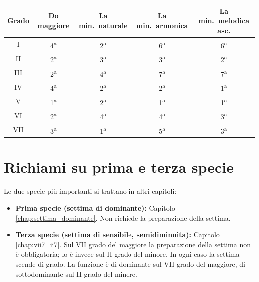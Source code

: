 \begin{center}
\begin{tabular}{ccccc}
\toprule
\textbf{Grado} & \textbf{Do maggiore} & \textbf{La min.\ naturale} & \textbf{La min.\ armonica} & \textbf{La min.\ melodica asc.} \\
\midrule
I & 4\textsuperscript{a} & 2\textsuperscript{a} & 6\textsuperscript{a} & 6\textsuperscript{a} \\
II & 2\textsuperscript{a} & 3\textsuperscript{a} & 3\textsuperscript{a} & 2\textsuperscript{a} \\
III & 2\textsuperscript{a} & 4\textsuperscript{a} & 7\textsuperscript{a} & 7\textsuperscript{a} \\
IV & 4\textsuperscript{a} & 2\textsuperscript{a} & 2\textsuperscript{a} & 1\textsuperscript{a} \\
V & 1\textsuperscript{a} & 2\textsuperscript{a} & 1\textsuperscript{a} & 1\textsuperscript{a} \\
VI & 2\textsuperscript{a} & 4\textsuperscript{a} & 4\textsuperscript{a} & 3\textsuperscript{a} \\
VII & 3\textsuperscript{a} & 1\textsuperscript{a} & 5\textsuperscript{a} & 3\textsuperscript{a} \\
\bottomrule
\end{tabular}
\end{center}

\section{Richiami su prima e terza specie}
\label{sec:richiami_specie}

Le due specie più importanti si trattano in altri capitoli:

\begin{itemize}
    \item \textbf{Prima specie (settima di dominante):} Capitolo \ref{chap:settima_dominante}. Non richiede la preparazione della settima.
    \item \textbf{Terza specie (settima di sensibile, semidiminuita):} Capitolo \ref{chap:vii7_ii7}. Sul VII grado del maggiore la preparazione della settima non è obbligatoria; lo è invece sul II grado del minore. In ogni caso la settima scende di grado. La funzione è di dominante sul VII grado del maggiore, di sottodominante sul II grado del minore.
\end{itemize}
